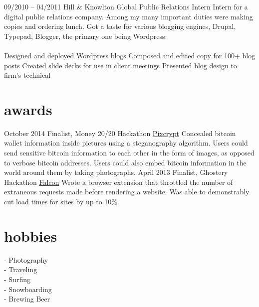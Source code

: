 \documentclass[]{friggeri-cv}
\begin{document}
\tabentry
  {09/2010 – 04/2011}
  {Hill \& Knowlton Global Public Relations}
  {Intern}
  {Intern for a digital public relations company. Among my many important duties were making copies and ordering lunch. Got a taste for various blogging engines, Drupal, Typepad, Blogger, the primary one being Wordpress.\\%
  \\%
    \bulletlist
    {Designed and deployed Wordpress blogs}
    {Composed and edited copy for 100+ blog posts}
    {Created slide decks for use in client meetings}
    {Presented blog design to firm's technical }
  }

\section{awards}

\begin{entrylist}
  \entry
    {October 2014}
    {Finalist, Money 20/20 Hackathon}
    {\href{http://github.com/dopatraman/pixcrypt}{Pixcrypt}}
    {Concealed bitcoin wallet information inside pictures using a steganography algorithm. Users could send sensitive bitcoin information to each other in the form of images, as opposed to verbose bitcoin addresses. Users could also embed bitcoin information in the world around them by taking photographs.}
  \entry
    {April 2013}
    {Finalist, Ghostery Hackathon}
    {\href{http://github.com/dopatraman/FalconExtension}{Falcon}}
    {Wrote a browser extension that throttled the number of extraneous requests made before rendering a website. Was able to demonstrably cut load times for sites by up to 10\%.}
\end{entrylist}

\section{hobbies}

  - Photography\\%
  - Traveling\\%
  - Surfing\\%
  - Snowboarding\\%
  - Brewing Beer\\%
\end{document}
